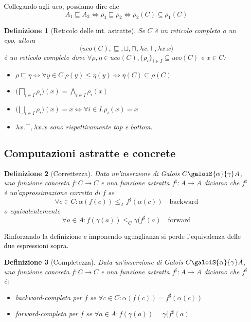\documentclass[a4paper, 11pt]{article}
\newtheorem{definit}{Definizione}[subsection]
\begin{document}
	Collegando agli uco, possiamo dire che \[ A_1 \sqsubseteq A_2 \Leftrightarrow \rho_1 \sqsubseteq \rho_2 \Leftrightarrow \rho_2(C) \subseteq \rho_1(C) \]
	
	\begin{definit}[Reticolo delle int. astratte]
		Se $C$ è un reticolo completo o un cpo, allora \[ \langle uco(C), \sqsubseteq, \sqcup, \sqcap, \lambda x.\top, \lambda x.x \rangle \] è un reticolo completo dove $\forall \rho, \eta \in uco(C), \{ \rho_i \}_{i \in I} \subseteq uco(C)$ e $x \in C$:\begin{itemize}
			\item $\rho \sqsubseteq \eta \Leftrightarrow \forall y \in C.\rho(y) \leq \eta(y) \Leftrightarrow \eta(C) \subseteq \rho(C)$
			
			\item $ \displaystyle \Big( \bigsqcap_{i \in I} \rho_i \Big)(x) = \bigwedge_{i \in I} \rho_i(x)$
			
			\item $ \displaystyle \Big( \bigsqcup_{i \in I} \rho_i \Big)(x) = x \Leftrightarrow \forall i \in I. \rho_i(x)=x$
			
			\item $\lambda x.\top, \lambda x.x$ sono rispettivamente top e bottom. 
		\end{itemize}
	\end{definit}

	\subsection{Computazioni astratte e concrete}
	\begin{definit}[Correttezza]
		Data un'inserzione di Galois $C \galoiS{\alpha}{\gamma} A$, una funzione concreta $f: C \to C$ e una funzione astratta $f^\sharp: A \to A$ diciamo che $f^\sharp$ è un'approssimazione corretta di $f$ se \[ \forall c \in C: \alpha(f(c)) \leq_A f^\sharp(\alpha(c)) \quad \text{backward} \] o equivalentemente \[ \forall a \in A: f(\gamma(a)) \leq_C \gamma(f^\sharp(a) \quad \text{forward} \]
	\end{definit}
	
	Rinforzando la definizione e imponendo uguaglianza si perde l'equivalenza delle due espressioni sopra. 
	\begin{definit}[Completezza]
		Data un'inserzione di Galois $C \galoiS{\alpha}{\gamma} A$, una funzione concreta $f: C \to C$ e una funzione astratta $f^\sharp: A \to A$ diciamo che $f^\sharp$ è: \begin{itemize}
			\item backward-completa per $f$ se  $\forall c \in C: \alpha(f(c)) = f^\sharp(\alpha(c))$
			\item forward-completa per $f$ se $\forall a \in A: f(\gamma(a)) = \gamma(f^\sharp(a)$
		\end{itemize}
	\end{definit}
	
\end{document}
